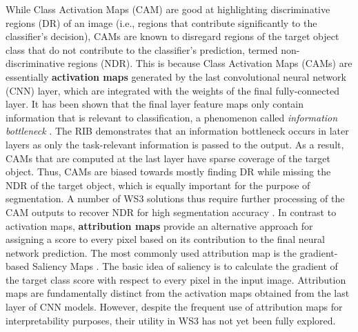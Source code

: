 \documentclass[11pt]{article}
\begin{document}
While Class Activation Maps (CAM) are good at highlighting discriminative regions (DR) of an image (i.e., regions that contribute significantly to the classifier’s decision), CAMs are known to disregard regions of the target object class that do not contribute to the classifier’s prediction, termed non-discriminative regions (NDR). This is because Class Activation Maps (CAMs) are essentially \textbf{activation maps} generated by the last convolutional neural network (CNN) layer, which are integrated with the weights of the final fully-connected layer. It has been shown that the final layer feature maps only contain information that is relevant to classification, a phenomenon called \textit{information bottleneck} \cite{lee2021reducing}. The RIB \cite{lee2021reducing} demonstrates that an information bottleneck occurs in later layers as only the task-relevant information is passed to the output. As a result, CAMs that are computed at the last layer have sparse coverage of the target object. Thus, CAMs are biased towards mostly finding DR while missing the NDR of the target object, which is equally important for the purpose of segmentation. A number of WS3 solutions thus require further processing of the CAM outputs to recover NDR for high segmentation accuracy \cite{li2018tell, hou2018self}. \newline
In contrast to activation maps, \textbf{attribution maps} provide an alternative approach for assigning a score to every pixel based on its contribution to the final neural network prediction. The most commonly used attribution map is the gradient-based Saliency Maps \cite{simonyan2013deep}. The basic idea of saliency is to calculate the gradient of the target class score with respect to every pixel in the input image. Attribution maps are fundamentally distinct from the activation maps obtained from the last layer of CNN models. However, despite the frequent use of attribution maps for interpretability purposes, their utility in WS3 has not yet been fully explored. 
\newpage
\printbibliography
\end{document}
